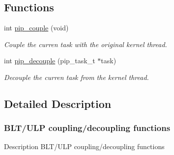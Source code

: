 \documentclass[twoside]{book}
\begin{document}
\subsection*{Functions}
\begin{DoxyCompactItemize}
\item 
int \hyperlink{group__ulp-6-coupling_ga62b74934c0295bbe1aeab544365eb20f}{pip\-\_\-couple} (void)
\begin{DoxyCompactList}\small\item\em Couple the curren task with the original kernel thread. \end{DoxyCompactList}\item 
int \hyperlink{group__ulp-6-coupling_ga1c77a30388d68e5f12667007ae430c1b}{pip\-\_\-decouple} (pip\-\_\-task\-\_\-t $\ast$task)
\begin{DoxyCompactList}\small\item\em Decouple the curren task from the kernel thread. \end{DoxyCompactList}\end{DoxyCompactItemize}


\subsection{Detailed Description}
\hypertarget{ulp-coupling}{}\subsubsection{B\-L\-T/\-U\-L\-P coupling/decoupling functions}\label{ulp-coupling}
\begin{DoxyParagraph}{Description}
B\-L\-T/\-U\-L\-P coupling/decoupling functions 
\end{DoxyParagraph}
\end{document}
